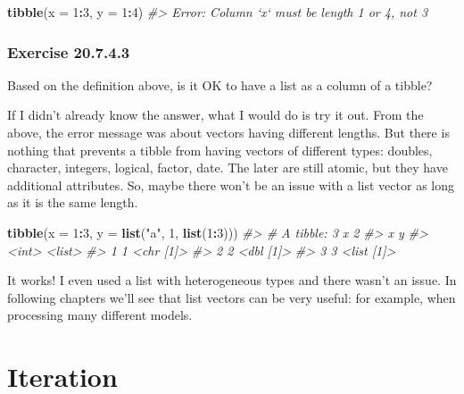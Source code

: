\documentclass[]{book}
\newenvironment{Shaded}{\begin{snugshade}}{\end{snugshade}}
\newcommand{\CommentTok}[1]{\textcolor[rgb]{0.56,0.35,0.01}{\textit{#1}}}
\newcommand{\DataTypeTok}[1]{\textcolor[rgb]{0.13,0.29,0.53}{#1}}
\newcommand{\DecValTok}[1]{\textcolor[rgb]{0.00,0.00,0.81}{#1}}
\newcommand{\KeywordTok}[1]{\textcolor[rgb]{0.13,0.29,0.53}{\textbf{#1}}}
\newcommand{\NormalTok}[1]{#1}
\newcommand{\OperatorTok}[1]{\textcolor[rgb]{0.81,0.36,0.00}{\textbf{#1}}}
\newcommand{\StringTok}[1]{\textcolor[rgb]{0.31,0.60,0.02}{#1}}
\theoremstyle{plain}
\theoremstyle{remark}
\begin{document}
\begin{Shaded}
\begin{Highlighting}[]
\KeywordTok{tibble}\NormalTok{(}\DataTypeTok{x =} \DecValTok{1}\OperatorTok{:}\DecValTok{3}\NormalTok{, }\DataTypeTok{y =} \DecValTok{1}\OperatorTok{:}\DecValTok{4}\NormalTok{)}
\CommentTok{#> Error: Column `x` must be length 1 or 4, not 3}
\end{Highlighting}
\end{Shaded}

\hypertarget{exercise-20.7.4.3}{%
\subsection*{\texorpdfstring{Exercise
{20.7.4.3}}{Exercise 20.7.4.3}}\label{exercise-20.7.4.3}}

Based on the definition above, is it OK to have a list as a column of a
tibble?

If I didn't already know the answer, what I would do is try it out. From
the above, the error message was about vectors having different lengths.
But there is nothing that prevents a tibble from having vectors of
different types: doubles, character, integers, logical, factor, date.
The later are still atomic, but they have additional attributes. So,
maybe there won't be an issue with a list vector as long as it is the
same length.

\begin{Shaded}
\begin{Highlighting}[]
\KeywordTok{tibble}\NormalTok{(}\DataTypeTok{x =} \DecValTok{1}\OperatorTok{:}\DecValTok{3}\NormalTok{, }\DataTypeTok{y =} \KeywordTok{list}\NormalTok{(}\StringTok{"a"}\NormalTok{, }\DecValTok{1}\NormalTok{, }\KeywordTok{list}\NormalTok{(}\DecValTok{1}\OperatorTok{:}\DecValTok{3}\NormalTok{)))}
\CommentTok{#> # A tibble: 3 x 2}
\CommentTok{#>       x y         }
\CommentTok{#>   <int> <list>    }
\CommentTok{#> 1     1 <chr [1]> }
\CommentTok{#> 2     2 <dbl [1]> }
\CommentTok{#> 3     3 <list [1]>}
\end{Highlighting}
\end{Shaded}

It works! I even used a list with heterogeneous types and there wasn't
an issue. In following chapters we'll see that list vectors can be very
useful: for example, when processing many different models.

\hypertarget{iteration}{%
\chapter{Iteration}\label{iteration}}
\end{document}

